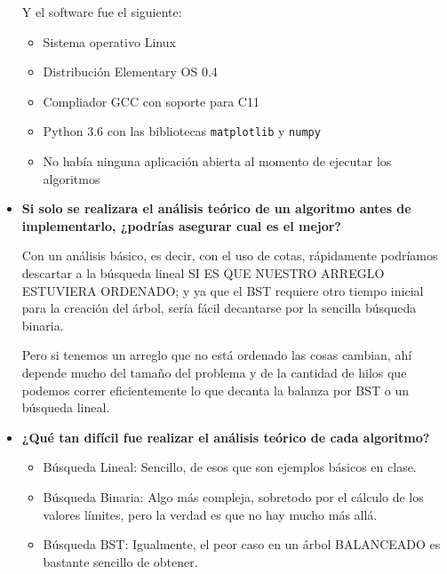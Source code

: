 \documentclass[12pt, fleqn]{article}                             %
\theoremstyle{break}                                            %
\begin{document}
\begin{itemize}
                Y el software fue el siguiente:
                \begin{itemize}\setlength\itemsep{0em}
                    \item Sistema operativo Linux
                    \item Distribución Elementary OS 0.4
                    \item Compliador GCC con soporte para C11
                    \item Python 3.6 con las bibliotecas \texttt{matplotlib} y \texttt{numpy}
                    \item No había ninguna aplicación abierta al momento de ejecutar los algoritmos
                \end{itemize}

            \item
                \textbf{Si solo se realizara el análisis teórico de un algoritmo antes de
                implementarlo, ¿podrías asegurar cual es el mejor?}

                Con un análisis básico, es decir, con el uso de cotas, rápidamente podríamos descartar a
                la búsqueda lineal SI ES QUE NUESTRO ARREGLO ESTUVIERA ORDENADO; y ya que el BST
                requiere otro tiempo inicial para la creación del árbol, sería fácil decantarse por
                la sencilla búsqueda binaria.

                Pero si tenemos un arreglo que no está ordenado las cosas cambian, ahí depende mucho
                del tamaño del problema y de la cantidad de hilos que podemos correr eficientemente
                lo que decanta la balanza por BST o un búsqueda lineal.

            \item
                \textbf{¿Qué tan difícil fue realizar el análisis teórico de cada algoritmo?}

                \begin{itemize}
                    \item Búsqueda Lineal: Sencillo, de esos que son ejemplos básicos en clase.
                    \item Búsqueda Binaria: Algo más compleja, sobretodo por el cálculo de los
                    valores límites, pero la verdad es que no hay mucho más allá.
                    \item Búsqueda BST: Igualmente, el peor caso en un árbol BALANCEADO es bastante sencillo
                    de obtener.


\end{itemize}
\end{itemize}
\end{document}
